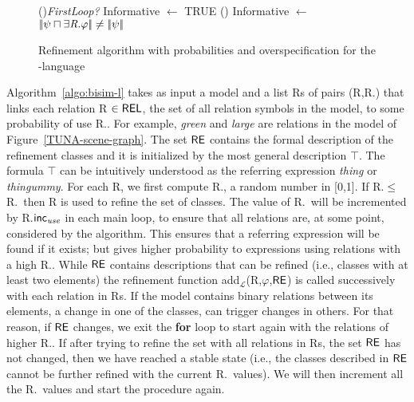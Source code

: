 \begin{figure}[!t]
\begin{algorithm}[H]
\If(){\em FirstLoop?}{
    Informative $\leftarrow$ TRUE }
\lElse() {Informative $\leftarrow$ $|\!|\psi \sqcap \exists \mbox{\em R}.\varphi|\!| \neq |\!|\psi|\!|$} 
\end{algorithm}
\vspace*{-.3cm}\caption{Refinement algorithm with probabilities and overspecification for the \el-language}\label{fig:algo3}

\end{figure}

Algorithm~\ref{algo:bisim-l} takes as input a model and a list Rs of pairs (R,R.\puse) that links each relation R $\in \textsf{REL}$, the set of all relation symbols in the model,  to some probability of use R.\puse. For example, \emph{green} and \emph{large} are relations in the model of Figure~\ref{TUNA-scene-graph}.  
%
The set $\textsf{RE}$ contains the formal description of the refinement classes and it is initialized by the most general description $\top$. The formula $\top$ can be intuitively understood as the referring expression \emph{thing} or \emph{thingummy}.  
For each R, we first compute R.\randomuse, a random number in [0,1].  If R.\randomuse $\le$ R.\puse\ then R is used to refine the set of classes.  The value of R.\puse\ will be incremented by R.$\textsf{inc}_\emph{use}$ in each main loop, to ensure that all relations are, at some point, considered by the algorithm.  This ensures that a referring expression will be found if it exists; but gives higher probability to expressions using relations with a high R.\puse. 
While $\textsf{RE}$ contains descriptions that can be refined (i.e., classes with at least two elements) the refinement function add$_\mathcal{L}$(R,$\varphi$,$\textsf{RE}$) is called successively with each relation in Rs. If the model contains binary relations between its elements, a change in one of the classes, can trigger changes in others. For that reason, if $\textsf{RE}$ changes, we exit the \textbf{for} loop to start again with the relations of higher R.\puse. If after trying to refine the set with all relations in Rs, the set $\textsf{RE}$ has not changed, then we have reached a stable state (i.e., the classes described in $\textsf{RE}$ cannot be further refined with the current R.\puse\ values). We will then increment all the R.\puse\ values and start the procedure again. 

